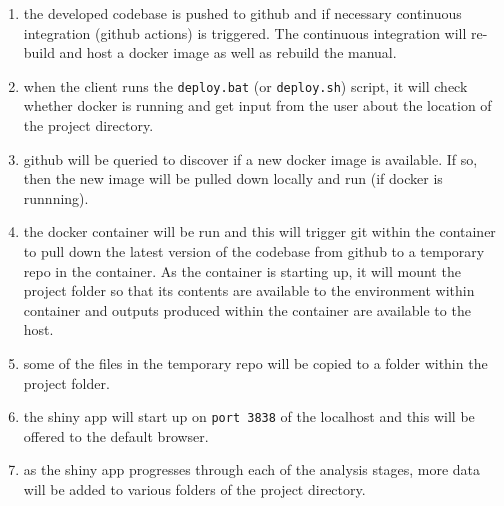 \documentclass[
  8pt,
  a4paper]{article}
\providecommand{\tightlist}{%
  \setlength{\itemsep}{0pt}\setlength{\parskip}{0pt}}\usepackage{longtable,booktabs,array}
\begin{document}
\begin{enumerate}
\def\labelenumi{\arabic{enumi}.}
\tightlist
\item
  the developed codebase is pushed to github and if necessary continuous
  integration (github actions) is triggered. The continuous integration
  will re-build and host a docker image as well as rebuild the manual.
\item
  when the client runs the \texttt{deploy.bat} (or \texttt{deploy.sh})
  script, it will check whether docker is running and get input from the
  user about the location of the project directory.
\item
  github will be queried to discover if a new docker image is available.
  If so, then the new image will be pulled down locally and run (if
  docker is runnning).
\item
  the docker container will be run and this will trigger git within the
  container to pull down the latest version of the codebase from github
  to a temporary repo in the container. As the container is starting up,
  it will mount the project folder so that its contents are available to
  the environment within container and outputs produced within the
  container are available to the host.
\item
  some of the files in the temporary repo will be copied to a folder
  within the project folder.
\item
  the shiny app will start up on \texttt{port\ 3838} of the localhost
  and this will be offered to the default browser.
\item
  as the shiny app progresses through each of the analysis stages, more
  data will be added to various folders of the project directory.
\end{enumerate}
\end{document}
